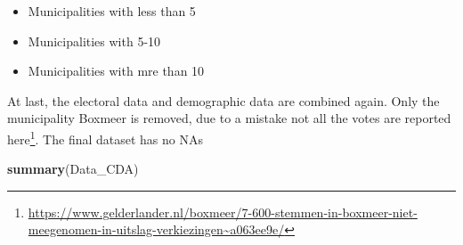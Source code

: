 \documentclass[11pt,]{article}
\newenvironment{Shaded}{\begin{snugshade}}{\end{snugshade}}
\newcommand{\KeywordTok}[1]{\textcolor[rgb]{0.13,0.29,0.53}{\textbf{#1}}}
\newcommand{\DecValTok}[1]{\textcolor[rgb]{0.00,0.00,0.81}{#1}}
\newcommand{\FloatTok}[1]{\textcolor[rgb]{0.00,0.00,0.81}{#1}}
\newcommand{\StringTok}[1]{\textcolor[rgb]{0.31,0.60,0.02}{#1}}
\newcommand{\OtherTok}[1]{\textcolor[rgb]{0.56,0.35,0.01}{#1}}
\newcommand{\OperatorTok}[1]{\textcolor[rgb]{0.81,0.36,0.00}{\textbf{#1}}}
\newcommand{\NormalTok}[1]{#1}
\let\rmarkdownfootnote\footnote%
\def\footnote{\protect\rmarkdownfootnote}
\begin{document}
\begin{itemize}
\item Municipalities with less than 5 %
\item Municipalities with 5-10 %
\item Municipalities with mre than 10 %
\end{itemize}

\begin{Shaded}
\end{Shaded}

At last, the electoral data and demographic data are combined again.
Only the municipality Boxmeer is removed, due to a mistake not all the
votes are reported here\footnote{\url{https://www.gelderlander.nl/boxmeer/7-600-stemmen-in-boxmeer-niet-meegenomen-in-uitslag-verkiezingen~a063ee9e/}}.
The final dataset has no NAs

\begin{Shaded}
\begin{Highlighting}[]
\KeywordTok{summary}\NormalTok{(Data_CDA)}
\end{Highlighting}
\end{Shaded}
\end{document}
